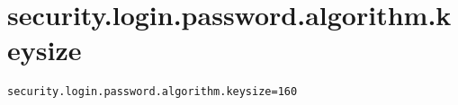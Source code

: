 \section{security.login.password.algorithm.keysize}
\label{configuration:SecurityLoginPasswordAlgorithmKeysize}
\AvailableInJavaOnly{\TODO}
\begin{lstlisting}[style=Props,caption={Usage example for \textit{security.login.password.algorithm.keysize}}]
security.login.password.algorithm.keysize=160
\end{lstlisting}